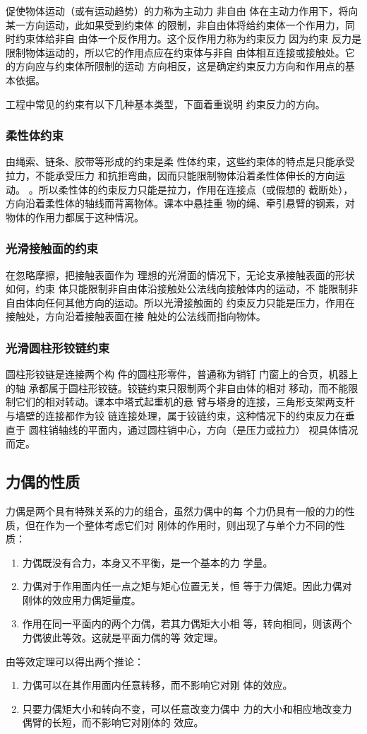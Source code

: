 促使物体运动（或有运动趋势）的力称为主动力 非自由
体在主动力作用下，将向某一方向运动，此如果受到约束体
的限制，非自由体将给约束体一个作用力，同时约束体给非自
由体一个反作用力。这个反作用力称为约束反力 因为约束
反力是限制物体运动的，所以它的作用点应在约束体与非自
由体相互连接或接触处。它的方向应与约束体所限制的运动
方向相反，这是确定约束反力方向和作用点的基本依据。

工程中常见的约束有以下几种基本类型，下面着重说明
约束反力的方向。

\subsubsection{柔性体约束}

由绳索、链条、胶带等形成的约束是柔
性体约束，这些约束体的特点是只能承受拉力，不能承受压力
和抗拒弯曲，因而只能限制物体沿着柔性体伸长的方向运动。
。所以柔性体的约束反力只能是拉力，作用在连接点（或假想的
截断处），方向沿着柔性体的轴线而背离物体。课本中悬挂重
物的绳、牵引悬臂的钢素，对物体的作用力都属于这种情况。

\subsubsection{光滑接触面的约束}

在忽略摩擦，把接触表面作为
理想的光滑面的情况下，无论支承接触表面的形状如何，约束
体只能限制非自由体沿接触处公法线向接触体内的运动，不
能限制非自由体向任何其他方向的运动。所以光滑接触面的
约束反力只能是压力，作用在接触处，方向沿着接触表面在接
触处的公法线而指向物体。

\subsubsection{光滑圆柱形铰链约束}

圆柱形铰链是连接两个构
件的圆柱形零件，普通称为销钉 门窗上的合页，机器上的轴
承都属于圆柱形铰链。铰链约束只限制两个非自由体的相对
移动，而不能限制它们的相对转动。课本中塔式起重机的悬
臂与塔身的连接，三角形支架两支杆与墙壁的连接都作为铰
链连接处理，属于铰链约束，这种情况下的约束反力在垂直于
圆柱销轴线的平面内，通过圆柱销中心，方向（是压力或拉力）
视具体情况而定。

\subsection{力偶的性质}
力偶是两个具有特殊关系的力的组合，虽然力偶中的每
个力仍具有一般的力的性质，但在作为一个整体考虑它们对
刚体的作用时，则出现了与单个力不同的性质：
\begin{enumerate}
\item 力偶既没有合力，本身又不平衡，是一个基本的力
学量。
\item 力偶对于作用面内任一点之矩与矩心位置无关，恒
等于力偶矩。因此力偶对刚体的效应用力偶矩量度。
\item 作用在同一平面内的两个力偶，若其力偶矩大小相
等，转向相同，则该两个力偶彼此等效。这就是平面力偶的等
效定理。
\end{enumerate}

由等效定理可以得出两个推论：
\begin{enumerate}
\item 力偶可以在其作用面内任意转移，而不影响它对刚
体的效应。
\item 只要力偶矩大小和转向不变，可以任意改变力偶中
力的大小和相应地改变力偶臂的长短，而不影响它对刚体的
效应。
\end{enumerate}





